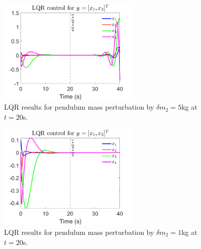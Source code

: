 \documentclass[12pt]{article}
\numberwithin{equation}{section}
\begin{document}
\begin{figure}
    \centering
    \includegraphics[width=0.6\textwidth]{lqr_offset_m2_5kg.png}
    \caption{LQR results for pendulum mass perturbation by $\delta m_2 = 5$kg at $t = 20$s.}
    \label{fig:lqr_perturb_5kg}
\end{figure}

\begin{figure}
    \centering
    \includegraphics[width=0.6\textwidth]{lqr_offset_m2_1kg.png}
    \caption{LQR results for pendulum mass perturbation by $\delta m_2 = 1$kg at $t = 20$s.}
    \label{fig:lqr_perturb_1kg}
\end{figure}
\end{document}
